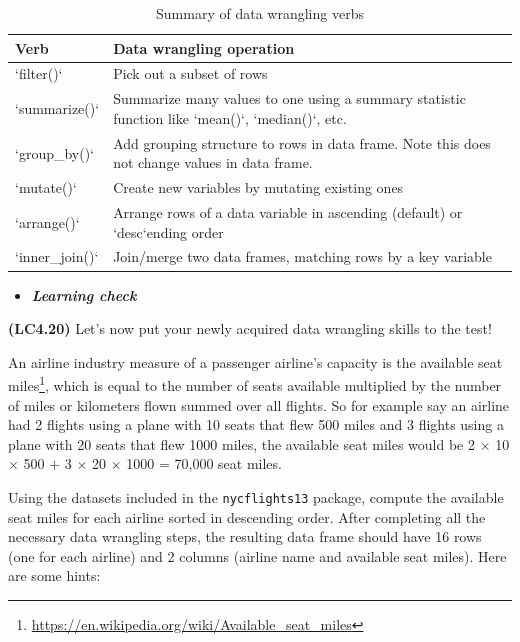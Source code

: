 \documentclass[12pt, krantz2,]{krantz}
\renewcommand{\href}[2]{#2\footnote{\url{#1}}}
\newenvironment{rmdblock}[1]
  {\begin{shaded*}
  \begin{itemize}
  \renewcommand{\labelitemi}{
    \raisebox{-.7\height}[0pt][0pt]{
    }
  }
  \item
  }
  {
  \end{itemize}
  \end{shaded*}
  }
\newenvironment{learncheck}
  {\begin{rmdblock}{warning}}
  {\end{rmdblock}}
\begin{document}
\begin{table}[H]

\caption{\label{tab:wrangle-summary-table}Summary of data wrangling verbs}
\centering
\fontsize{10}{12}\selectfont
\begin{tabular}{>{\raggedright\arraybackslash}p{0.9in}>{\raggedright\arraybackslash}p{3.3in}}
\toprule
Verb & Data wrangling operation\\
\midrule
`filter()` & Pick out a subset of rows\\
`summarize()` & Summarize many values to one using a summary statistic function like `mean()`, `median()`, etc.\\
`group\_by()` & Add grouping structure to rows in data frame. Note this does not change values in data frame.\\
`mutate()` & Create new variables by mutating existing ones\\
`arrange()` & Arrange rows of a data variable in ascending (default) or `desc`ending order\\
\addlinespace
`inner\_join()` & Join/merge two data frames, matching rows by a key variable\\
\bottomrule
\end{tabular}
\end{table}

\begin{learncheck}
\textbf{\emph{Learning check}}
\end{learncheck}

\textbf{(LC4.20)} Let's now put your newly acquired data wrangling skills to the test!

An airline industry measure of a passenger airline's capacity is the \href{https://en.wikipedia.org/wiki/Available_seat_miles}{available seat miles}, which is equal to the number of seats available multiplied by the number of miles or kilometers flown summed over all flights. So for example say an airline had 2 flights using a plane with 10 seats that flew 500 miles and 3 flights using a plane with 20 seats that flew 1000 miles, the available seat miles would be 2 \(\times\) 10 \(\times\) 500 \(+\) 3 \(\times\) 20 \(\times\) 1000 = 70,000 seat miles.

Using the datasets included in the \texttt{nycflights13} package, compute the available seat miles for each airline sorted in descending order. After completing all the necessary data wrangling steps, the resulting data frame should have 16 rows (one for each airline) and 2 columns (airline name and available seat miles). Here are some hints:
\end{document}
